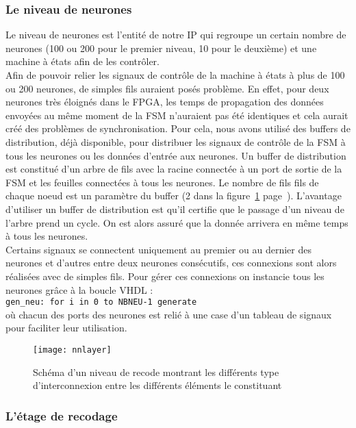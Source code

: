 \subsubsection{Le niveau de neurones}
Le niveau de neurones est l'entité de notre IP qui regroupe un certain nombre
de neurones (100 ou 200 pour le premier niveau, 10 pour le deuxième) et une
machine à états afin de les contrôler. \\
Afin de pouvoir relier les signaux de contrôle de la machine à états à plus de
100 ou 200 neurones, de simples fils auraient posés
problème. En effet, pour deux neurones très éloignés dans le FPGA, les temps
de propagation des données envoyées au même moment de la FSM n'auraient pas été
identiques et cela aurait créé des problèmes de synchronisation. Pour cela, nous
avons utilisé des buffers de distribution, déjà disponible, pour distribuer les
signaux de contrôle de la FSM à tous les neurones ou les données d'entrée aux neurones. 
Un buffer de distribution est constitué d'un arbre de fils avec la racine connectée à un port de sortie de la FSM et les feuilles
connectées à tous les neurones. Le nombre de fils fils de chaque noeud est un
paramètre du buffer (2 dans la figure~\ref{fig:nnlayer} page~\pageref{fig:nnlayer}). 
L'avantage d'utiliser un buffer de distribution est qu'il certifie que le passage d'un niveau de l'arbre 
prend un cycle. On est alors assuré que la donnée arrivera en même
temps à tous les neurones. \\
Certains signaux se connectent uniquement au premier ou au dernier des neurones
et d'autres entre deux neurones consécutifs, ces connexions sont alors réalisées avec de simples fils. 
Pour gérer ces connexions on instancie tous les neurones grâce à la boucle VHDL :\\
\texttt{gen\_neu: for i in 0 to NBNEU-1 generate} \\
où chacun des ports des neurones est relié à une case d'un tableau de signaux pour
faciliter leur utilisation.

\begin{figure}[h!]
	\texttt{[image: nnlayer]}
	\caption{Schéma d'un niveau de recode montrant les différents type 
	d'interconnexion entre les différents éléments le constituant}
	\label{fig:nnlayer}
\end{figure}

\subsubsection{L'étage de recodage}
\label{plan:recode}

